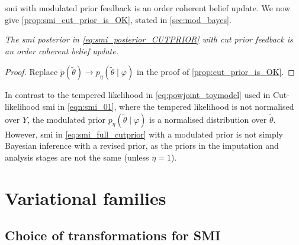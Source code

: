 \acrshort*{smi} with modulated prior feedback is an order coherent belief update. We now give \cref{prop:smi_cut_prior_is_OK}, stated in \cref{sec:mod_bayes}.

{\it
  The \acrshort*{smi} posterior in \cref{eq:smi_posterior_CUTPRIOR} with cut prior feedback is an order coherent belief update.
}
\begin{proof} \label{proof:smi_cut_prior_is_OK}
  Replace $\tilde p(\tilde\theta)\to p_\eta(\tilde\theta \mid \varphi)$ in the proof of \cref{prop:cut_prior_is_OK}.
\end{proof}
In contrast to the tempered likelihood in \cref{eq:powjoint_toymodel} used in Cut-likelihood \acrshort*{smi} in \cref{eqn:smi_01}, where the tempered likelihood is not normalised over $Y$, the modulated prior $p_\eta(\tilde\theta \mid \varphi)$ is a normalised distribution over $\tilde\theta$. However, \acrshort*{smi} in \cref{eq:smi_full_cutprior} with a modulated prior is not simply Bayesian inference with a revised prior, as the priors in the imputation and analysis stages are not the same (unless $\eta=1$).

%

\newpage
\section{Variational families} \label{sec:variational_families_details}

\subsection{Choice of transformations for SMI} \label{subsec:smi_flow}

